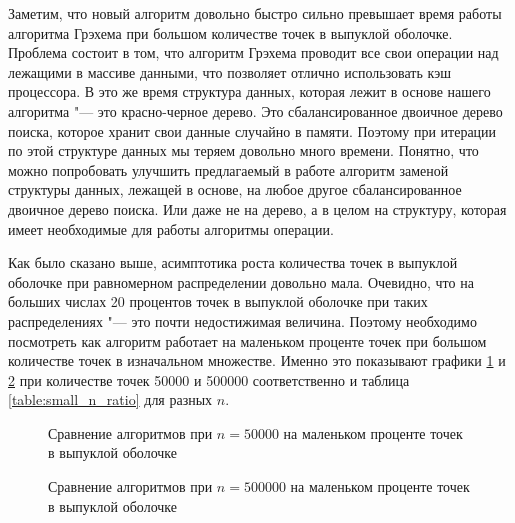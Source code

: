 Заметим, что новый алгоритм довольно быстро сильно превышает время работы алгоритма Грэхема при большом количестве точек в выпуклой оболочке. Проблема состоит в том, что алгоритм Грэхема проводит все свои операции над лежащими в массиве данными, что позволяет отлично использовать кэш процессора. В это же время структура данных, которая лежит в основе нашего алгоритма "--- это красно-черное дерево. Это сбалансированное двоичное дерево поиска, которое хранит свои данные случайно в памяти. Поэтому при итерации по этой структуре данных мы теряем довольно много времени. Понятно, что можно попробовать улучшить предлагаемый в работе алгоритм заменой структуры данных, лежащей в основе, на любое другое сбалансированное двоичное дерево поиска. Или даже не на дерево, а в целом на структуру, которая имеет необходимые для работы алгоритмы операции.

Как было сказано выше, асимптотика роста количества точек в выпуклой оболочке при равномерном распределении довольно мала. Очевидно, что на больших числах 20 процентов точек в выпуклой оболочке при таких распределениях "--- это почти недостижимая величина. Поэтому необходимо посмотреть как алгоритм работает на маленьком проценте точек при большом количестве точек в изначальном множестве. Именно это показывают графики \ref{img:comparison2_50000} и \ref{img:comparison2_500000} при количестве точек 50000 и 500000 соответственно и таблица \ref{table:small_n_ratio} для разных $n$.

\begin{figure}[hbt]
	\centering
	
	\caption{Сравнение алгоритмов при $n = 50000$ на маленьком проценте точек в выпуклой оболочке}
	\label{img:comparison2_50000}
\end{figure}

\begin{figure}[hbt]
	\centering
	
	\caption{Сравнение алгоритмов при $n = 500000$ на маленьком проценте точек в выпуклой оболочке}
	\label{img:comparison2_500000}
\end{figure}

